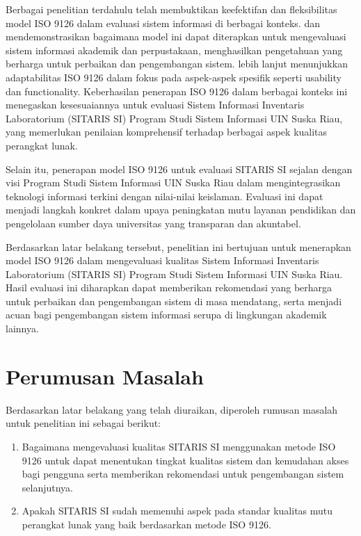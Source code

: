 Berbagai penelitian terdahulu telah membuktikan keefektifan dan fleksibilitas model ISO 9126 dalam evaluasi sistem informasi di berbagai konteks. \cite{dwiyantoro2020evaluasi} dan \cite{melathi2017penerapan} mendemonstrasikan bagaimana model ini dapat diterapkan untuk mengevaluasi sistem informasi akademik dan perpustakaan, menghasilkan pengetahuan yang berharga untuk perbaikan dan pengembangan sistem. \cite{rohman2022evaluasi} lebih lanjut menunjukkan adaptabilitas ISO 9126 dalam fokus pada aspek-aspek spesifik seperti usability dan functionality. Keberhasilan penerapan ISO 9126 dalam berbagai konteks ini menegaskan kesesuaiannya untuk evaluasi Sistem Informasi Inventaris Laboratorium (SITARIS SI) Program Studi Sistem Informasi UIN Suska Riau, yang memerlukan penilaian komprehensif terhadap berbagai aspek kualitas perangkat lunak.

Selain itu, penerapan model ISO 9126 untuk evaluasi SITARIS SI sejalan dengan visi Program Studi Sistem Informasi UIN Suska Riau dalam mengintegrasikan teknologi informasi terkini dengan nilai-nilai keislaman. Evaluasi ini dapat menjadi langkah konkret dalam upaya peningkatan mutu layanan pendidikan dan pengelolaan sumber daya universitas yang transparan dan akuntabel.

Berdasarkan latar belakang tersebut, penelitian ini bertujuan untuk menerapkan model ISO 9126 dalam mengevaluasi kualitas Sistem Informasi Inventaris Laboratorium (SITARIS SI) Program Studi Sistem Informasi UIN Suska Riau. Hasil evaluasi ini diharapkan dapat memberikan rekomendasi yang berharga untuk perbaikan dan pengembangan sistem di masa mendatang, serta menjadi acuan bagi pengembangan sistem informasi serupa di lingkungan akademik lainnya.

\section{Perumusan Masalah}
Berdasarkan latar belakang yang telah diuraikan, diperoleh rumusan masalah untuk penelitian ini sebagai berikut:
\begin{enumerate}
	\item Bagaimana mengevaluasi kualitas SITARIS SI menggunakan metode ISO 9126 untuk dapat menentukan tingkat kualitas sistem dan kemudahan akses bagi pengguna serta memberikan rekomendasi untuk pengembangan sistem selanjutnya.
	\item Apakah SITARIS SI sudah memenuhi aspek pada standar kualitas mutu perangkat lunak yang baik berdasarkan metode ISO 9126.
\end{enumerate}

